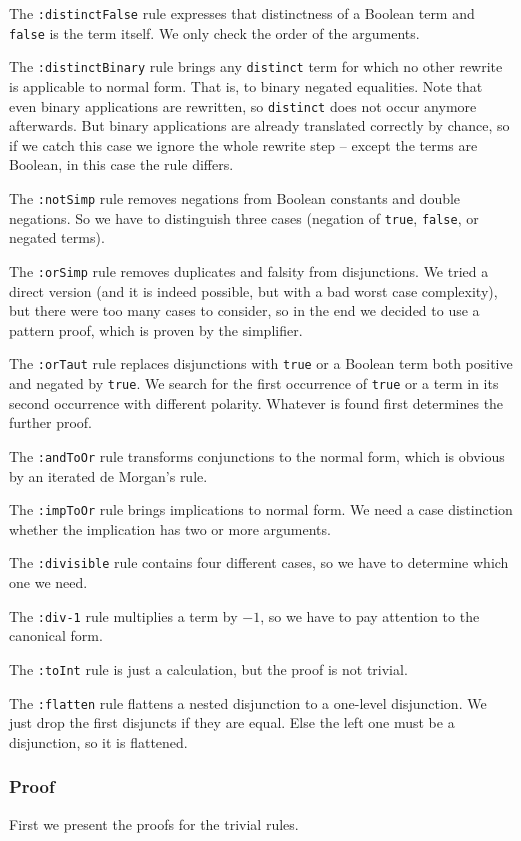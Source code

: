\documentclass[10pt,a4paper]{article}
\newcommand{\ttt}{\texttt}
\newcommand{\true}{\ttt{true}\xspace}
\newcommand{\false}{\ttt{false}\xspace}
\begin{document}
The \ttt{:distinctFalse} rule expresses that distinctness of a Boolean term and \false is the term itself. We only check the order of the arguments.

The \ttt{:distinctBinary} rule brings any \ttt{distinct} term for which no other rewrite is applicable to normal form. That is, to binary negated equalities. Note that even binary applications are rewritten, so \ttt{distinct} does not occur anymore afterwards. But binary applications are already translated correctly by chance, so if we catch this case we ignore the whole rewrite step -- except the terms are Boolean, in this case the rule differs.

The \ttt{:notSimp} rule removes negations from Boolean constants and double negations. So we have to distinguish three cases (negation of \true, \false, or negated terms).

The \ttt{:orSimp} rule removes duplicates and falsity from disjunctions. We tried a direct version (and it is indeed possible, but with a bad worst case complexity), but there were too many cases to consider, so in the end we decided to use a pattern proof, which is proven by the simplifier.

The \ttt{:orTaut} rule replaces disjunctions with \true or a Boolean term both positive and negated by \true. We search for the first occurrence of \true or a term in its second occurrence with different polarity. Whatever is found first determines the further proof.

The \ttt{:andToOr} rule transforms conjunctions to the normal form, which is obvious by an iterated de Morgan's rule.

The \ttt{:impToOr} rule brings implications to normal form. We need a case distinction whether the implication has two or more arguments.

The \ttt{:divisible} rule contains four different cases, so we have to determine which one we need.

The \ttt{:div-1} rule multiplies a term by $-1$, so we have to pay attention to the canonical form.

The \ttt{:toInt} rule is just a calculation, but the proof is not trivial.

The \ttt{:flatten} rule flattens a nested disjunction to a one-level disjunction. We just drop the first disjuncts if they are equal. Else the left one must be a disjunction, so it is flattened.
%
\subsubsection*{Proof}
First we present the proofs for the trivial rules.
\end{document}
